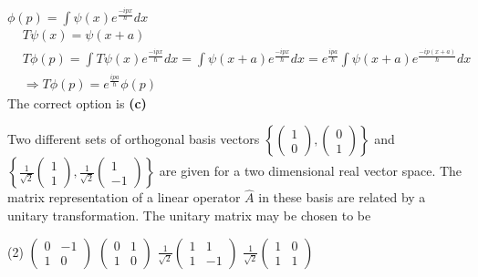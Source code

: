\begin{enumerate}
\begin{answer}
	$\phi(p)=\int \psi(x) e^{\frac{-i p x}{\hbar}} d x$\\
	\begin{align*}
		&T \psi(x)=\psi(x+a) \\
		&T \phi(p)=\int T \psi(x) e^{\frac{-i p x}{\hbar}} d x=\int \psi(x+a) e^{\frac{-i p x}{\hbar}} d x=e^{\frac{i p a}{\hbar}} \int \psi(x+a) e^{\frac{-i p(x+a)}{\hbar}} d x \\
		&\Rightarrow T \phi(p)=e^{\frac{i p a}{\hbar}} \phi(p)
	\end{align*}
	The correct option is \textbf{(c)}
\end{answer}
\begin{minipage}{\textwidth}
	\item Two different sets of orthogonal basis vectors $\left\{\left(\begin{array}{l}1 \\ 0\end{array}\right),\left(\begin{array}{l}0 \\ 1\end{array}\right)\right\}$ and $\left\{\frac{1}{\sqrt{2}}\left(\begin{array}{l}1 \\ 1\end{array}\right), \frac{1}{\sqrt{2}}\left(\begin{array}{c}1 \\ -1\end{array}\right)\right\}$ are given for a two dimensional real vector space. The matrix representation of a linear operator $\hat{A}$ in these basis are related by a unitary transformation. The unitary matrix may be chosen to be
\end{minipage}
\begin{tasks}(2)
	\task[\textbf{A.}] $\left(\begin{array}{cc}0 & -1 \\ 1 & 0\end{array}\right)$
	\task[\textbf{B.}]$\left(\begin{array}{ll}0 & 1 \\ 1 & 0\end{array}\right)$
	\task[\textbf{C.}]$\frac{1}{\sqrt{2}}\left(\begin{array}{cc}1 & 1 \\ 1 & -1\end{array}\right)$
	\task[\textbf{D.}] $\frac{1}{\sqrt{2}}\left(\begin{array}{ll}1 & 0 \\ 1 & 1\end{array}\right)$

\end{tasks}
\end{enumerate}
